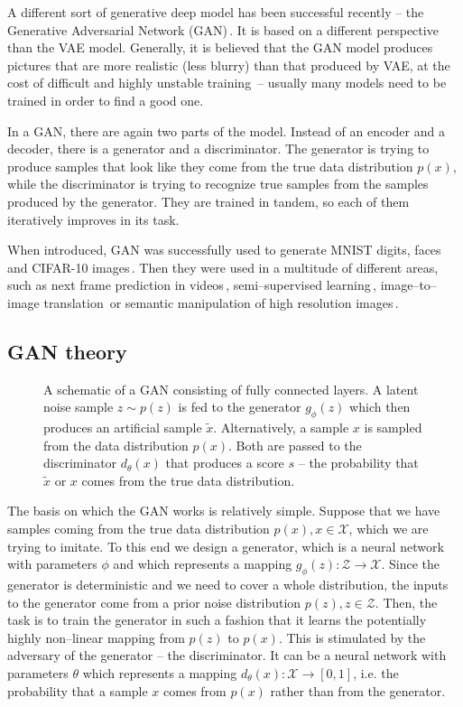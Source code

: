 A different sort of generative deep model has been successful recently
-- the Generative Adversarial Network (GAN)\,\cite{goodfellow2014gan}.
It is based on a different perspective than the VAE model. Generally,
it is believed that the GAN model produces pictures that are more
realistic (less blurry) than that produced by VAE, at the cost of
difficult and highly unstable training\,\cite{salimans2016fmgan}
-- usually many models need to be trained in order to find a good
one. 

In a GAN, there are again two parts of the model. Instead of an encoder
and a decoder, there is a generator and a discriminator. The generator
is trying to produce samples that look like they come from the true
data distribution $p(x)$, while the discriminator is trying to recognize
true samples from the samples produced by the generator. They are
trained in tandem, so each of them iteratively improves in its task.

When introduced, GAN was successfully used to generate MNIST digits,
faces and CIFAR-10 images\,\cite{goodfellow2014gan}. Then they were
used in a multitude of different areas, such as next frame prediction
in videos\,\cite{lotter2015unsupervised}, semi--supervised learning\,\cite{salimans2016fmgan},
image--to--image translation\,\cite{zhu2016generative} or semantic
manipulation of high resolution images\,\cite{wang2018high}.

\subsection{GAN theory}

\begin{figure}
\centering{}\caption{A schematic of a GAN consisting of fully connected layers. A latent
noise sample $z\sim p(z)$ is fed to the generator $g_{\phi}(z)$
which then produces an artificial sample $\tilde{x}$. Alternatively,
a sample $x$ is sampled from the data distribution $p(x)$. Both
are passed to the discriminator $d_{\theta}(x)$ that produces a score
$s$ -- the probability that $\tilde{x}$ or $x$ comes from the
true data distribution.}
\label{fig:gan}
\end{figure}
 

The basis on which the GAN works is relatively simple. Suppose that
we have samples coming from the true data distribution $p(x),x\in\mathcal{X}$,
which we are trying to imitate. To this end we design a generator,
which is a neural network with parameters $\phi$ and which represents
a mapping $g_{\phi}(z):\mathcal{Z}\rightarrow\mathcal{X}$. Since
the generator is deterministic and we need to cover a whole distribution,
the inputs to the generator come from a prior noise distribution $p(z),z\in\mathcal{Z}$.
Then, the task is to train the generator in such a fashion that it
learns the potentially highly non--linear mapping from $p(z)$ to
$p(x)$. This is stimulated by the adversary of the generator --
the discriminator. It can be a neural network with parameters $\theta$
which represents a mapping $d_{\theta}(x):\mathcal{X}\rightarrow\left[0,1\right]$,
i.e. the probability that a sample $x$ comes from $p(x)$ rather
than from the generator.

